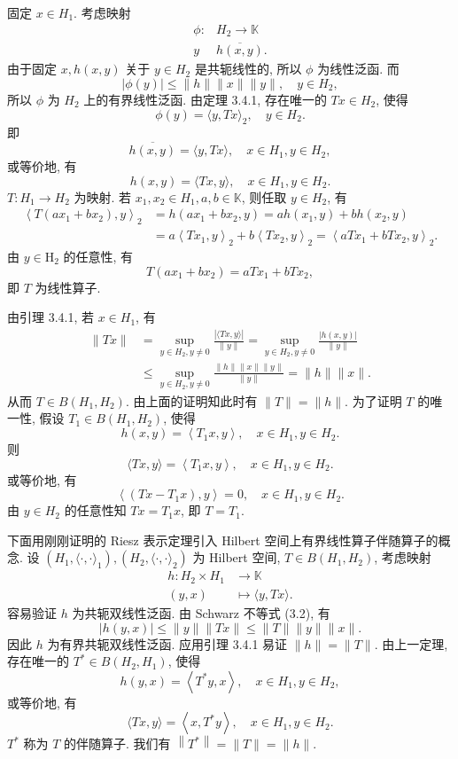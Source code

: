 \documentclass[openany]{ctexbook}
\makeatletter
\theoremstyle{kaiti}
\theoremstyle{normal}
\renewenvironment{proof}[1][\proofname]{\par
    \pushQED{\qed}%
    \normalfont \topsep6\p@\@plus6\p@\relax
    \trivlist
    \item\relax
    {\heiti #1}\hspace{2\labelsep}\ignorespaces
  }{%
    \popQED\endtrivlist\@endpefalse
  }
\makeatother
\begin{document}
\begin{proof}
固定 $x \in H_1$. 考虑映射
$$
\begin{aligned}
\phi: & H_2 \rightarrow \mathbb{K} \\
y & \overline{h(x, y)}.
\end{aligned}
$$
由于固定 $x, h(x, y)$ 关于 $y \in H_2$ 是共轭线性的, 所以 $\phi$ 为线性泛函. 而
$$
|\phi(y)| \leqslant\|h\|\|x\|\|y\|, \quad y \in H_2,
$$
所以 $\phi$ 为 $H_2$ 上的有界线性泛函. 由定理 3.4.1, 存在唯一的 $T x \in H_2$, 使得
$$
\phi(y)=\langle y, T x\rangle_2, \quad y \in H_2.
$$
即
$$
\overline{h(x, y)}=\langle y, T x\rangle, \quad x \in H_1, y \in H_2,
$$
或等价地, 有
$$
h(x, y)=\langle T x, y\rangle, \quad x \in H_1, y \in H_2.
$$
$T: H_1 \rightarrow H_2$ 为映射. 若 $x_1, x_2 \in H_1, a, b \in \mathbb{K}$, 则任取 $y \in H_2$, 有
$$
\begin{aligned}
\left\langle T\left(a x_1+b x_2\right), y\right\rangle_2 &=h\left(a x_1+b x_2, y\right)=a h\left(x_1, y\right)+b h\left(x_2, y\right) \\
&=a\left\langle T x_1, y\right\rangle_2+b\left\langle T x_2, y\right\rangle_2=\left\langle a T x_1+b T x_2, y\right\rangle_2.
\end{aligned}
$$
由 $y \in \mathrm{H}_2$ 的任意性, 有
$$
T\left(a x_1+b x_2\right)=a T x_1+b T x_2,
$$
即 $T$ 为线性算子.

由引理 3.4.1, 若 $x \in H_1$, 有
$$
\begin{aligned}
\|T x\| &=\sup_{y \in H_2, y \neq 0} \frac{|\langle T x, y\rangle|}{\|y\|}=\sup_{y \in H_2, y \neq 0} \frac{|h(x, y)|}{\|y\|} \\
& \leqslant \sup_{y \in H_2, y \neq 0} \frac{\|h\|\|x\|\|y\|}{\|y\|}=\|h\|\|x\|.
\end{aligned}
$$
从而 $T \in B\left(H_1, H_2\right)$. 由上面的证明知此时有 $\|T\|=\|h\|$.
为了证明 $T$ 的唯一性, 假设 $T_1 \in B\left(H_1, H_2\right)$, 使得
$$
h(x, y)=\left\langle T_1 x, y\right\rangle, \quad x \in H_1, y \in H_2.
$$
则
$$
\langle T x, y\rangle=\left\langle T_1 x, y\right\rangle, \quad x \in H_1, y \in H_2.
$$
或等价地, 有
$$
\left\langle\left(T x-T_1 x\right), y\right\rangle=0, \quad x \in H_1, y \in H_2.
$$
由 $y \in H_2$ 的任意性知 $T x=T_1 x$, 即 $T=T_1$.
\end{proof}

下面用刚刚证明的 Riesz 表示定理引入 Hilbert 空间上有界线性算子伴随算子的概念. 设 $\left(H_1,\langle\cdot, \cdot\rangle_1\right),\left(H_2,\langle\cdot, \cdot\rangle_2\right)$ 为 Hilbert 空间, $T \in B\left(H_1, H_2\right)$, 考虑映射
$$
\begin{aligned}
h: H_2 \times H_1 & \rightarrow \mathbb{K} \\
(y, x) & \mapsto\langle y, T x\rangle.
\end{aligned}
$$
容易验证 $h$ 为共轭双线性泛函. 由 Schwarz 不等式 (3.2), 有
$$
|h(y, x)| \leqslant\|y\|\|T x\| \leqslant\|T\|\|y\|\|x\|.
$$
因此 $h$ 为有界共轭双线性泛函. 应用引理 3.4.1 易证 $\|h\|=\|T\|$. 由上一定理, 存在唯一的 $T^{*} \in B\left(H_2, H_1\right)$, 使得
$$
h(y, x)=\left\langle T^{*} y, x\right\rangle, \quad x \in H_1, y \in H_2,
$$
或等价地, 有
$$
\langle T x, y\rangle=\left\langle x, T^{*} y\right\rangle, \quad x \in H_1, y \in H_2.
$$
$T^{*}$ 称为 $T$ 的伴随算子. 我们有 $\left\|T^{*}\right\|=\|T\|=\|h\|$.
\end{document}
